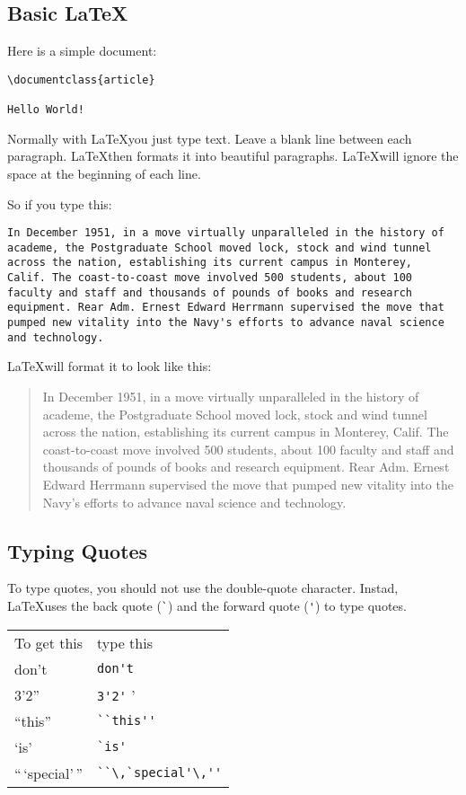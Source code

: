 \begin{enumerate}
\section{Basic \LaTeX}
Here is a simple document:
\begin{Verbatim}
\documentclass{article}

Hello World!

\end{Verbatim}

Normally with \LaTeX you just type text. Leave a blank line between
each paragraph. \LaTeX then formats it into beautiful
paragraphs. \LaTeX will ignore the space at the beginning of each line.

So if you type this:

\begin{Verbatim}
In December 1951, in a move virtually unparalleled in the history of
academe, the Postgraduate School moved lock, stock and wind tunnel
across the nation, establishing its current campus in Monterey,
Calif. The coast-to-coast move involved 500 students, about 100
faculty and staff and thousands of pounds of books and research
equipment. Rear Adm. Ernest Edward Herrmann supervised the move that
pumped new vitality into the Navy's efforts to advance naval science
and technology.
\end{Verbatim}

\LaTeX will format it to look like this:

\begin{quotation}
In December 1951, in a move virtually unparalleled in the history of
academe, the Postgraduate School moved lock, stock and wind tunnel
across the nation, establishing its current campus in Monterey,
Calif. The coast-to-coast move involved 500 students, about 100
faculty and staff and thousands of pounds of books and research
equipment. Rear Adm. Ernest Edward Herrmann supervised the move that
pumped new vitality into the Navy's efforts to advance naval science
and technology.
\end{quotation}

\subsection{Typing Quotes}

To type quotes, you should not use the double-quote character. Instad,
\LaTeX uses the back quote (\verb+`+) and the forward quote (\verb+'+)
to type quotes.

\begin{tabular}{ll}
To get this & type this \\
don't & \verb+don't+ \\
 3'2''  & \verb+3'2'+ '\\
``this'' & \verb+``this''+ \\
`is' & \verb+`is'+ \\
``\,`special'\,'' & \verb+``\,`special'\,''+ \\
\end{tabular}


\end{enumerate}

